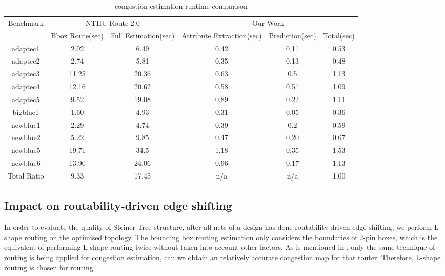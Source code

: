 \begin{table*}[htbp]
\caption{congestion estimation runtime comparison}
\begin{center}
\begin{tabular}{|c|c|c|c|c|c|}
\hline
\multirow{2}{*}{Benchmark} & \multicolumn{2}{c|}{NTHU-Route 2.0 \cite{NTHU}} & \multicolumn{3}{c|}{Our Work}        \\ \cline{2-6} 
                           & Bbox Route(sec)   & Full Estimation(sec)  & Attribute Extraction(sec) & Prediction(sec) & Total(sec) \\ \hline
adaptec1                   & 2.02         & 6.49             & 0.42                 & 0.11       & 0.53  \\ \hline
adaptec2                   & 2.74         & 5.81             & 0.35                 & 0.13       & 0.48  \\ \hline
adaptec3                   & 11.25        & 20.36            & 0.63                 & 0.5        & 1.13  \\ \hline
adaptec4                   & 12.16        & 20.62            & 0.58                 & 0.51       & 1.09  \\ \hline
adaptec5                   & 9.52         & 19.08            & 0.89                 & 0.22       & 1.11  \\ \hline
bigblue1                   & 1.60         & 4.93             & 0.31                 & 0.05       & 0.36  \\ \hline
newblue1                   & 2.29         & 4.74             & 0.39                 & 0.2        & 0.59  \\ \hline
newblue2                   & 5.22         & 9.85             & 0.47                 & 0.20       & 0.67  \\ \hline
newblue5                   & 19.71        & 34.5             & 1.18                 & 0.35       & 1.53  \\ \hline
newblue6                   & 13.90        & 24.06            & 0.96                 & 0.17       & 1.13  \\ \hline
Total Ratio                      & 9.33        & 17.45             & n/a                  & n/a        & 1.00 \\ \hline
\end{tabular}
\label{tab:runtime}
\end{center}
\end{table*}

\subsection{Impact on routability-driven edge shifting}
In order to evaluate the quality of Steiner Tree structure, after all nets of a design has done routability-driven edge shifting, we perform L-shape routing on the optimised topology. The bounding box routing estimation only considers the boundaries of 2-pin boxes, which is the equivalent of performing L-shape routing twice without taken into account other factors. As is mentioned in \cite{fastroute}, only the same technique of routing is being applied for congestion estimation, can we obtain an relatively accurate congestion map for that router. Therefore, L-shape routing is chosen for routing.

